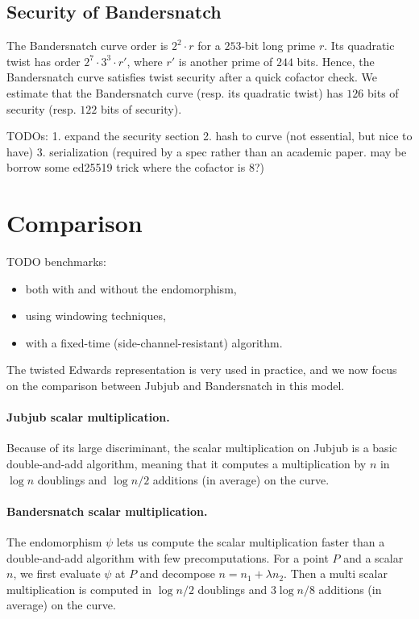 \documentclass{article}
\newcommand{\SM}[1]{\color{blue}#1\color{black}}
\newcommand{\ZZ}[1]{\color{cyan}#1\color{black}}
\theoremstyle{definition}
\begin{document}
\subsection{Security of Bandersnatch}

The Bandersnatch curve order is $2^2\cdot r$ for a $253$-bit long
prime $r$.
Its quadratic twist has order
$2^7 \cdot 3^3 \cdot r'$, where $r'$ is another prime of $244$ bits.
Hence, the Bandersnatch curve satisfies twist security after a quick cofactor
check.
We estimate that the Bandersnatch curve (resp. its quadratic twist)
has $126$ bits of security (resp. $122$ bits of security).

\ZZ{TODOs: 1. expand the security section 2. hash to curve (not essential, but nice to have)
3. serialization (required by a spec rather than an academic paper. may be borrow 
some ed25519 trick where the cofactor is 8?)}

\section{Comparison}\label{sec:comparison}

\SM{TODO benchmarks:}
\begin{itemize}
\item both with and without the endomorphism,
\item using windowing techniques,
\item with a fixed-time (side-channel-resistant) algorithm.
\end{itemize}

The twisted Edwards representation is very used in practice, and we
now focus on the comparison between Jubjub and Bandersnatch in this
model.

\paragraph{Jubjub scalar multiplication.}
Because of its large discriminant, the scalar multiplication on Jubjub
is a basic double-and-add algorithm, meaning that it computes a
multiplication by $n$ in $\log n$ doublings and $\log n/2$
additions (in average) on the curve. 

\paragraph{Bandersnatch scalar multiplication.}
The endomorphism $\psi$ lets us compute the scalar multiplication
faster than a double-and-add algorithm with few precomputations. For a
point $P$ and a scalar $n$, we first evaluate $\psi$ at $P$ and
decompose $n = n_1 + \lambda n_2$. Then a multi scalar multiplication
is computed in $\log n/2$ doublings and $3\log n/8$ additions (in average) on the curve.
\end{document}
